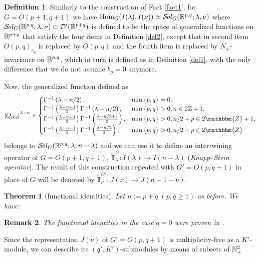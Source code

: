\documentclass[12pt]{article} %
\newtheorem{theorem}{Theorem}
\newcommand{\Hom}{\mbox{\normalfont Hom}}
\newcommand{\Sol}{\mathcal{S}\!{\it ol}}
\newtheorem{remark}[theorem]{Remark}
\theoremstyle{definition}
\newtheorem{definition}{Definition}
\theoremstyle{exampstyle} \newtheorem{examp}[theorem]{Theorem}
\renewcommand{\Q}{Q_{p,q}}
\begin{document}
	\begin{definition}
		Similarly to the construction of Fact \ref{fact1}, for $G=O(p+1,q+1)$ we have $\Hom_G(I(\lambda),I(\nu))\simeq\Sol_G(\R^{p,q};\lambda,\nu)$
		where $\Sol_G(\R^{p,q};\lambda,\nu)\subset\mathcal{D}'(\R^{p+q})$ is defined to be the space of generalized functions on $\mathbb{R}^{p+q}$ that satisfy
		the four items in Definition \ref{def2}, except that in second item $O(p,q)_{e_p}$ is replaced by $O(p,q)$ and the fourth item is replaced by $N_+$-invariance
		on $\mathbb{R}^{p,q}$, which in turn is defined as in Definition \ref{def1}, with the only difference that we do not assume $b_p=0$ anymore.

		Now, the generalized function defined as
		\begin{equation*}
			\myabs{\Q}^{\lambda-n}\times\begin{cases}
				\Gamma^{-1}\left( \lambda-n/2 \right),&\min\left\{ p,q \right\}=0,\\
				\Gamma^{-1}\left( \frac{\lambda-n+1}{2} \right)\Gamma^{-1}\left( \lambda-n/2 \right),&\min\left\{ p,q \right\}>0,n\in2\Z+1,\\
  \Gamma^{-1} \left( \frac{\lambda-n + 1}{2} \right) \Gamma ^{-1}\left( \frac{\lambda-n/2+
  1}{2} \right), &\min\left\{ p,q \right\}>0, n / 2 + p \in 2\mathbbm{Z}+ 1,\\
  \Gamma^{-1} \left( \frac{\lambda-n + 1}{2} \right) \Gamma ^{-1}\left( \frac{\lambda-n/2}{2}
  \right), & \min\left\{ p,q \right\}>0,n / 2 + p \in 2\mathbbm{Z}
			\end{cases}
		\end{equation*}
		belongs to $\Sol_G(\R^{p,q};\lambda,n-\lambda)$ and we can use it to
		define an intertwining operator of $G=O(p+1,q+1)$,
		$\tilde{\mathbb{T}}^{G}_{\lambda}:I(\lambda)\to
		I(n-\lambda)$
		(\textit{Knapp--Stein operator}).
		The result of this construction repeated with $G'=O(p,q+1)$ in place of $G$ will be denoted by $\tilde{\mathbb{T}}^{G'}_\nu:J(\nu)\to J(n-1-\nu)$.
	\end{definition}
	\begin{theorem}[functional identities]
		Let $n:=p+q\;(p,q\ge1)$ as before.
		We have:
	\end{theorem}
	\begin{remark}
		The functional identities in the case $q=0$ were proven in \cite[Thm. 12.6]{kobayashi2015program}.
	\end{remark}
	Since the representation $J(\nu)$ of $G'=O(p,q+1)$ is multiplicity-free as a $K'$-module, we can describe its $(\mathfrak{g}',K')$-submodules by means of subsets of $\mathbb{N}_{+}^2$
\end{document}
